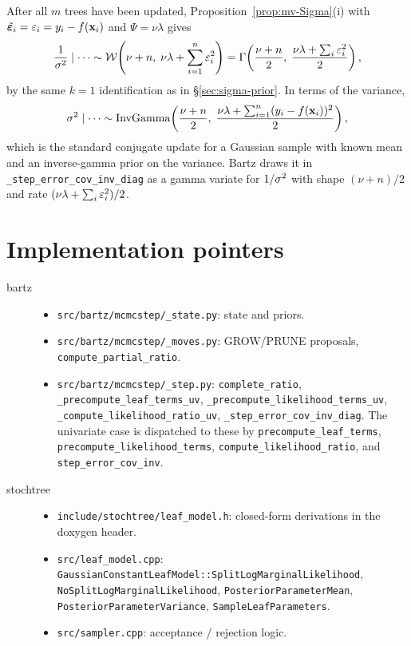 After all $m$ trees have been updated, Proposition~\ref{prop:mv-Sigma}(i) with
$\tilde{\bm{\varepsilon}}_i = \varepsilon_i = y_i - f(\mathbf{x}_i)$ and $\Psi = \nu\lambda$
gives
\[
	\frac{1}{\sigma^{2}} \mid \cdots \sim
	\mathcal{W}\!\left(\nu + n,\; \nu\lambda + \sum_{i=1}^n \varepsilon_i^2\right)
	= \Gamma\!\left(\frac{\nu + n}{2},\; \frac{\nu\lambda + \sum_i \varepsilon_i^2}{2}\right),
\]
by the same $k = 1$ identification as in \S\ref{sec:sigma-prior}. In terms
of the variance,
\begin{equation}
	\label{eq:sigma-fc}
	\sigma^{2} \mid \cdots \sim
	\mathrm{InvGamma}\!\left(
	\frac{\nu + n}{2},\;
	\frac{\nu\lambda + \sum_{i=1}^n (y_i - f(\mathbf{x}_i))^2}{2}
	\right),
\end{equation}
which is the standard conjugate update for a Gaussian sample with known
mean and an inverse-gamma prior on the variance. Bartz draws it in
\texttt{\_step\_error\_cov\_inv\_diag} as a gamma variate for $1/\sigma^{2}$
with shape $(\nu + n)/2$ and rate $(\nu\lambda + \sum_i \varepsilon_i^2)/2$.

\section{Implementation pointers}
\label{sec:impl-vanilla}

\begin{description}
	\item[bartz]
	      \begin{itemize}
		      \item \texttt{src/bartz/mcmcstep/\_state.py}: state and priors.
		      \item \texttt{src/bartz/mcmcstep/\_moves.py}: GROW/PRUNE
		            proposals, \texttt{compute\_partial\_ratio}.
		      \item \texttt{src/bartz/mcmcstep/\_step.py}:
		            \texttt{complete\_ratio},
		            \texttt{\_precompute\_leaf\_terms\_uv},
		            \texttt{\_precompute\_likelihood\_terms\_uv},
		            \texttt{\_compute\_likelihood\_ratio\_uv},
		            \texttt{\_step\_error\_cov\_inv\_diag}. The univariate
		            case is dispatched to these by
		            \texttt{precompute\_leaf\_terms},
		            \texttt{precompute\_likelihood\_terms},
		            \texttt{compute\_likelihood\_ratio}, and
		            \texttt{step\_error\_cov\_inv}.
	      \end{itemize}
	\item[stochtree]
	      \begin{itemize}
		      \item \texttt{include/stochtree/leaf\_model.h}: closed-form
		            derivations in the doxygen header.
		      \item \texttt{src/leaf\_model.cpp}:
		            \texttt{GaussianConstantLeafModel::SplitLogMarginalLikelihood},
		            \texttt{NoSplitLogMarginalLikelihood},
		            \texttt{PosteriorParameterMean},
		            \texttt{PosteriorParameterVariance},
		            \texttt{SampleLeafParameters}.
		      \item \texttt{src/sampler.cpp}: acceptance / rejection logic.
	      \end{itemize}
\end{description}
